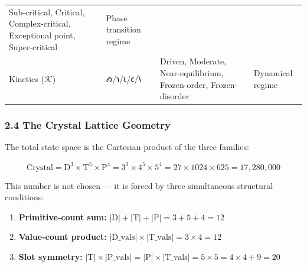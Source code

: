 \begin{longtable}[]{@{}llll@{}}
\begin{minipage}[t]{0.22\columnwidth}
Sub-critical, Critical, Complex-critical, Exceptional point,
Super-critical\strut
\end{minipage} & \begin{minipage}[t]{0.17\columnwidth}\raggedright
Phase transition regime\strut
\end{minipage}\tabularnewline
\begin{minipage}[t]{0.30\columnwidth}\raggedright
Kinetics (\(\mathcal{K}\))\strut
\end{minipage} & \begin{minipage}[t]{0.19\columnwidth}\raggedright
𐑺/𐑪/𐑧/𐑤/𐑘\strut
\end{minipage} & \begin{minipage}[t]{0.22\columnwidth}\raggedright
Driven, Moderate, Near-equilibrium, Frozen-order, Frozen-disorder\strut
\end{minipage} & \begin{minipage}[t]{0.17\columnwidth}\raggedright
Dynamical regime\strut
\end{minipage}\tabularnewline
\bottomrule
\end{longtable}

\hypertarget{the-crystal-lattice-geometry}{%
\subsubsection{2.4 The Crystal Lattice
Geometry}\label{the-crystal-lattice-geometry}}

The total state space is the Cartesian product of the three families:

\[\text{Crystal} = \text{D}^{3} \times \text{T}^{5} \times \text{P}^{4} = 3^3 \times 4^5 \times 5^4 = 27 \times 1024 \times 625 = 17,280,000\]

This number is not chosen --- it is forced by three simultaneous
structural conditions:

\begin{enumerate}
\def\labelenumi{\arabic{enumi}.}
\tightlist
\item
  \textbf{Primitive-count sum:}
  \(|\text{D}| + |\text{T}| + |\text{P}| = 3 + 5 + 4 = 12\)
\item
  \textbf{Value-count product:}
  \(|\text{D\_vals}| \times |\text{T\_vals}| = 3 \times 4 = 12\)
\item
  \textbf{Slot symmetry:}
  \(|\text{T}| \times |\text{P\_vals}| = |\text{P}| \times |\text{T\_vals}| = 5 \times 5 = 4 \times 4 + 9 = 20\)
\end{enumerate}

